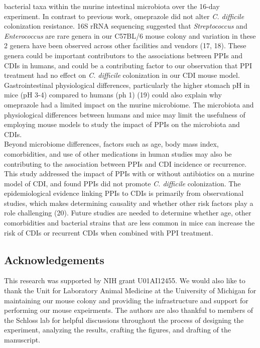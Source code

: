 \documentclass[11pt,]{article}
\begin{document}
bacterial taxa within the murine intestinal microbiota over the 16-day
experiment. In contrast to previous work, omeprazole did not alter
\emph{C. difficile} colonization resistance. 16S rRNA sequencing
suggested that \emph{Streptococcus} and \emph{Enterococcus} are rare
genera in our C57BL/6 mouse colony and variation in these 2 genera have
been observed across other facilities and vendors (17, 18). These genera
could be important contributors to the associations between PPIs and
CDIs in humans, and could be a contributing factor to our observation
that PPI treatment had no effect on \emph{C. difficile} colonization in
our CDI mouse model. Gastrointestinal physiological differences,
particularly the higher stomach pH in mice (pH 3-4) compared to humans
(ph 1) (19) could also explain why omeprazole had a limited impact on
the murine microbiome. The microbiota and physiological differences
between humans and mice may limit the usefulness of employing mouse
models to study the impact of PPIs on the microbiota and CDIs.\\
Beyond microbiome differences, factors such as age, body mass index,
comorbidities, and use of other medications in human studies may also be
contributing to the association between PPIs and CDI incidence or
recurrence. This study addressed the impact of PPIs with or without
antibiotics on a murine model of CDI, and found PPIs did not promote
\emph{C. difficile} colonization. The epidemiological evidence linking
PPIs to CDIs is primarily from observational studies, which makes
determining causality and whether other risk factors play a role
challenging (20). Future studies are needed to determine whether age,
other comorbidities and bacterial strains that are less common in mice
can increase the risk of CDIs or recurrent CDIs when combined with PPI
treatment.

\subsection{Acknowledgements}\label{acknowledgements}

This research was supported by NIH grant U01AI12455. We would also like
to thank the Unit for Laboratory Animal Medicine at the University of
Michigan for maintaining our mouse colony and providing the
infrastructure and support for performing our mouse expeirments. The
authors are also thankful to members of the Schloss lab for helpful
discussions throughout the process of designing the experiment,
analyzing the results, crafting the figures, and drafting of the
manuscript.
\end{document}
